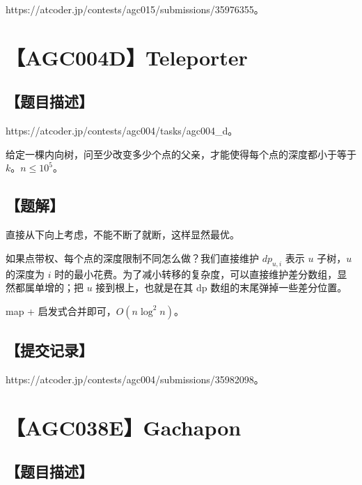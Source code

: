 \documentclass[UTF8,12pt,a4paper]{ctexart}
\begin{document}
	https://atcoder.jp/contests/agc015/submissions/35976355。
	
	
	\section*{【AGC004D】Teleporter}
	
	\subsection*{【题目描述】}
	
	https://atcoder.jp/contests/agc004/tasks/agc004\_d。
	
	给定一棵内向树，问至少改变多少个点的父亲，才能使得每个点的深度都小于等于 $k$。$n\le 10^5$。
	
	\subsection*{【题解】}
	
	直接从下向上考虑，不能不断了就断，这样显然最优。
	
	如果点带权、每个点的深度限制不同怎么做？我们直接维护 $dp_{u,i}$ 表示 $u$ 子树，$u$ 的深度为 $i$ 时的最小花费。为了减小转移的复杂度，可以直接维护差分数组，显然都属单增的；把 $u$ 接到根上，也就是在其 dp 数组的末尾弹掉一些差分位置。
	
	map + 启发式合并即可，$O(n\log^2 n)$。
	
	\subsection*{【提交记录】}
	
	https://atcoder.jp/contests/agc004/submissions/35982098。
	
	
	\section*{【AGC038E】Gachapon}
	
	\subsection*{【题目描述】}
	
\end{document}
